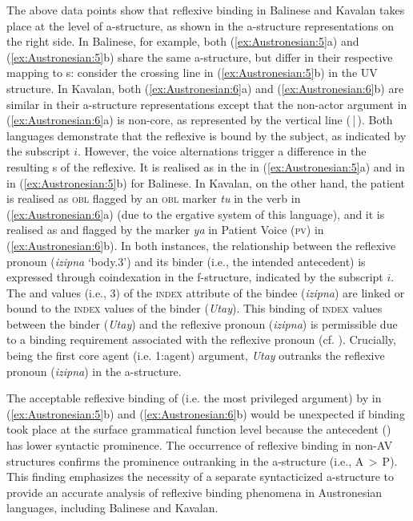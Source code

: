 \documentclass[output=paper,chinesefont]{../langscibook}
\begin{document}
The above data points show that reflexive binding in Balinese and Kavalan takes place at the level of a-structure, as shown in the a-structure representations on the right side. In Balinese, for example, both (\ref{ex:Austronesian:5}a) and (\ref{ex:Austronesian:5}b) share the same a-structure, but differ in their respective mapping to {\GF}s: consider the crossing line in (\ref{ex:Austronesian:5}b) in the UV structure. In Kavalan, both (\ref{ex:Austronesian:6}a) and (\ref{ex:Austronesian:6}b) are similar in their a-structure representations except that the non-actor argument in (\ref{ex:Austronesian:6}a) is non-core, as represented by the vertical line (\,|\,). Both languages demonstrate that the reflexive is bound by the subject, as indicated by the subscript $i$. However, the voice alternations trigger a difference in the resulting {\GF}s of the reflexive. It is realised as \OBJ in the \AV in (\ref{ex:Austronesian:5}a) and \SUBJ in \UV in (\ref{ex:Austronesian:5}b) for Balinese. In Kavalan, on the other hand, the patient is realised as \textsc{obl} flagged by an \textsc{obl} marker \emph{tu} in the \AV verb in (\ref{ex:Austronesian:6}a) (due to the ergative system of this language), and it is realised as \SUBJ and flagged by the marker \emph{ya} in Patient Voice (\textsc{pv}) in (\ref{ex:Austronesian:6}b). In both instances, the relationship between the reflexive pronoun (\emph{izipna} `body.3\GEN') and its binder (i.e., the intended antecedent) is expressed through coindexation in the f-structure, indicated by the subscript $i$. The \PERS and \NUM values (i.e., 3\SG) of the \textsc{index} attribute of the bindee (\emph{izipna}) are linked or bound to the \textsc{index} values of the binder (\emph{Utay}). This binding of \textsc{index} values between the binder (\emph{Utay}) and the reflexive pronoun (\emph{izipna}) is permissible due to a binding requirement associated with the reflexive pronoun (cf. ). Crucially, being the first core agent (i.e. {\textlangle}1:agent\textrangle) argument, \emph{Utay} outranks the reflexive pronoun (\emph{izipna}) in the a-structure. 

The acceptable reflexive binding of \SUBJ(i.e. the most privileged argument) by \OBJ in (\ref{ex:Austronesian:5}b) and (\ref{ex:Austronesian:6}b) would be unexpected if binding took place at the surface grammatical function level because the antecedent (\OBJ) has lower syntactic prominence. The occurrence of reflexive binding in non-AV structures confirms the prominence outranking in the a-structure (i.e., A\,$>$\,P). This finding emphasizes the necessity of a separate syntacticized a-structure to provide an accurate analysis of reflexive binding phenomena in Austronesian languages, including Balinese and Kavalan.
\end{document}

